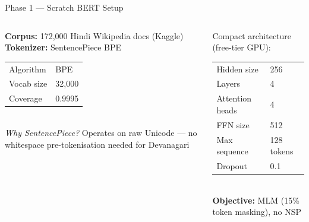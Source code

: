 \documentclass[aspectratio=169]{beamer}
\begin{document}
\begin{frame}{Phase 1 — Scratch BERT Setup}
  \begin{columns}[T]
      \begin{tcolorbox}[nbox={Corpus \& Tokenizer}]
        \small
        \textbf{Corpus:} 172,000 Hindi Wikipedia docs (Kaggle)\\[5pt]
        \textbf{Tokenizer:} SentencePiece BPE\\[4pt]
        \renewcommand{\arraystretch}{1.3}
        \begin{tabular}{@{}ll@{}}
          \toprule
          Algorithm    & BPE\\
          Vocab size   & 32,000\\
          Coverage     & 0.9995\\
          \bottomrule
        \end{tabular}\\[6pt]
        \textit{Why SentencePiece?} Operates on raw Unicode —
        no whitespace pre-tokenisation needed for Devanagari
      \end{tcolorbox}

      \begin{tcolorbox}[nbox={BERT Model Configuration}]
        \small
        Compact architecture (free-tier GPU):\\[4pt]
        \renewcommand{\arraystretch}{1.3}
        \begin{tabular}{@{}ll@{}}
          \toprule
          Hidden size    & 256\\
          Layers         & 4\\
          Attention heads& 4\\
          FFN size       & 512\\
          Max sequence   & 128 tokens\\
          Dropout        & 0.1\\
          \bottomrule
        \end{tabular}\\[6pt]
        \textbf{Objective:} MLM (15\% token masking), no NSP
      \end{tcolorbox}
  \end{columns}
\end{frame}
\end{document}
